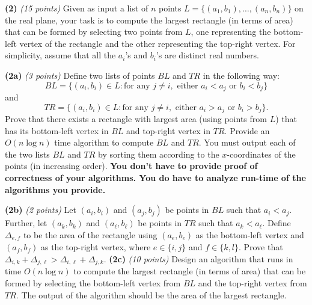 \documentclass[12pt]{article}
\def\gap{0.1in}
\def\bigap{0.25in}
\begin{document}
\setlength{\parindent}{0in}
\addtolength{\parskip}{0.1cm}
\setlength{\fboxrule}{.5mm}\setlength{\fboxsep}{1.2mm}
\newlength{\boxlength}\setlength{\boxlength}{\textwidth}
\addtolength{\boxlength}{-4mm}
\begin{center}
\end{center}
\vspace{5mm}
\vskip \bigap
{\bf (2)} {\em (15 points)} Given as input a list of $n$ points $L=\{(a_1,b_1),\ldots, (a_n,b_n)\}$ on the real plane, your task is to compute the largest rectangle (in terms of area) that can be formed by selecting two points from $L$, one representing the bottom-left vertex of the rectangle and the other representing the top-right vertex. For simplicity, assume that all the $a_i$'s and $b_i$'s are distinct real numbers.
\vskip \gap

{\bf (2a)} {\em (3 points)} Define two lists of points $BL$ and $TR$ in the following way:  $$BL = \{ (a_i,b_i) \in L: \text{for any }j \neq i,\text{ either } a_i<a_j\text{ or }b_i < b_j\}$$ and $$TR = \{ (a_i,b_i) \in L: \text{for any }j \neq i,\text{ either } a_i>a_j\text{ or }b_i > b_j\}.$$  Prove that there exists a  rectangle with largest area (using points from $L$) that has its bottom-left vertex in $BL$ and top-right vertex in $TR$. Provide an $O(n \log n)$ time algorithm to compute $BL$ and $TR$. You must output each of the two lists $BL$ and $TR$ by sorting them according to the $x$-coordinates of the points (in increasing order). \textbf{You don't have to provide proof of correctness of your algorithms. You do have to analyze run-time of the algorithms you provide.}

\vskip \gap
{\bf (2b)} {\em (2 points)} Let $(a_i,b_i)$ and $(a_j,b_j)$ be points in $BL$ such that $a_i <a_j$. Further, let $(a_k,b_k)$ and $(a_{\ell}, b_{\ell})$ be points in $TR$ such that $a_k < a_{\ell}$. Define $\Delta_{e,f}$ to be the area of the rectangle using $(a_e,b_e)$ as the bottom-left vertex and $(a_f,b_f)$ as the top-right vertex, where $e\in \{i,j\}$ and $f \in \{k,l\}$. Prove that $\Delta_{i,k} + \Delta_{j,\ell} > \Delta_{i,\ell} + \Delta_{j,k}$.
\vskip \gap
{\bf (2c)} {\em (10 points)} 
Design an algorithm  that runs in time $O(n \log n)$ to compute the largest rectangle (in terms of area) that can be formed by selecting the bottom-left vertex from $BL$ and the top-right vertex from $TR$. The output of the algorithm should be the area of the largest rectangle.
\vskip \bigap

\end{document}
